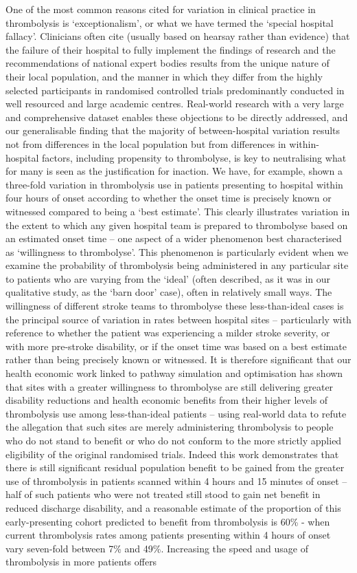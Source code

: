 One of the most common reasons cited for variation in clinical practice in thrombolysis is ‘exceptionalism’, or what we have termed the ‘special hospital fallacy’. Clinicians often cite (usually based on hearsay rather than evidence) that the failure of their hospital to fully implement the findings of research and the recommendations of national expert bodies results from the unique nature of their local population, and the manner in which they differ from the highly selected participants in randomised controlled trials predominantly conducted in well resourced and large academic centres. Real-world research with a very large and comprehensive dataset enables these objections to be directly addressed, and our generalisable finding that the majority of between-hospital variation results not from differences in the local population but from differences in within-hospital factors, including propensity to thrombolyse, is key to neutralising what for many is seen as the justification for inaction. We have, for example, shown a three-fold variation in thrombolysis use in patients presenting to hospital within four hours of onset according to whether the onset time is precisely known or witnessed compared to being a ‘best estimate’. This clearly illustrates variation in the extent to which any given hospital team is prepared to thrombolyse based on an estimated onset time – one aspect of a wider phenomenon best characterised as ‘willingness to thrombolyse’. This phenomenon is particularly evident when we examine the probability of thrombolysis being administered in any particular site to patients who are varying from the ‘ideal’ (often described, as it was in our qualitative study, as the ‘barn door’ case), often in relatively small ways. The willingness of different stroke teams to thrombolyse these less-than-ideal cases is the principal source of variation in rates between hospital sites – particularly with reference to whether the patient was experiencing a milder stroke severity, or with more pre-stroke disability, or if the onset time was based on a best estimate rather than being precisely known or witnessed. It is therefore significant that our health economic work linked to pathway simulation and optimisation has shown that sites with a greater willingness to thrombolyse are still delivering greater disability reductions and health economic benefits from their higher levels of thrombolysis use among less-than-ideal patients – using real-world data to refute the allegation that such sites are merely administering thrombolysis to people who do not stand to benefit or who do not conform to the more strictly applied eligibility of the original randomised trials. Indeed this work demonstrates that there is still significant residual population benefit to be gained from the greater use of thrombolysis in patients scanned within 4 hours and 15 minutes of onset – half of such patients who were not treated still stood to gain net benefit in reduced discharge disability, and a reasonable estimate of the proportion of this early-presenting cohort predicted to benefit from thrombolysis is 60\% - when current thrombolysis rates among patients presenting within 4 hours of onset vary seven-fold between 7\% and 49\%.  Increasing the speed and usage of thrombolysis in more patients offers 